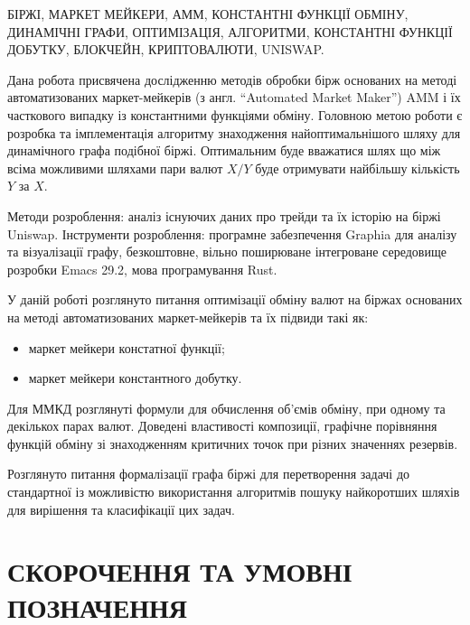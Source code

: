 \documentclass[14pt]{extarticle}
\begin{document}
БІРЖІ, МАРКЕТ МЕЙКЕРИ, АММ, КОНСТАНТНІ ФУНКЦІЇ ОБМІНУ, ДИНАМІЧНІ ГРАФИ,
ОПТИМІЗАЦІЯ, АЛГОРИТМИ, КОНСТАНТНІ ФУНКЦІЇ ДОБУТКУ, БЛОКЧЕЙН, КРИПТОВАЛЮТИ,
UNISWAP.

Дана робота присвячена дослідженню методів обробки бірж основаних на методі
автоматизованих маркет-мейкерів (з англ. ``Automated Market Maker'') AMM і їх
часткового випадку із константними функціями обміну. Головною метою роботи є
розробка та імплементація алгоритму знаходження найоптимальнішого шляху для
динамічного графа подібної біржі. Оптимальним буде вважатися шлях що між всіма
можливими шляхами пари валют $X/Y$ буде отримувати найбільшу кількість $Y$ за
$X$.

Методи розроблення: аналіз існуючих даних про трейди та їх історію на біржі
Uniswap. Інструменти розроблення: програмне забезпечення Graphia для аналізу та
візуалізації графу, безкоштовне, вільно поширюване інтегроване середовище
розробки Emacs 29.2, мова програмування Rust.

У даній роботі розглянуто питання оптимізації обміну валют на біржах основаних
на методі автоматизованих маркет-мейкерів та їх підвиди такі як:

\begin{itemize}
	\item маркет мейкери констатної функції;
	\item маркет мейкери константного добутку.
\end{itemize}

Для ММКД розглянуті формули для обчислення об'ємів обміну, при одному та
декількох парах валют. Доведені властивості композиції, графічне порівняння
функцій обміну зі знаходженням критичних точок при різних значеннях резервів.

Розглянуто питання формалізації графа біржі для перетворення задачі до
стандартної із можливістю використання алгоритмів пошуку найкоротших шляхів для
вирішення та класифікації цих задач.

\newpage

\renewcommand{\contentsname}{ЗМІСТ}
\setcounter{tocdepth}{2}
\tableofcontents
\newpage

\section*{СКОРОЧЕННЯ ТА УМОВНІ ПОЗНАЧЕННЯ}\label{sec:notation}
\end{document}

